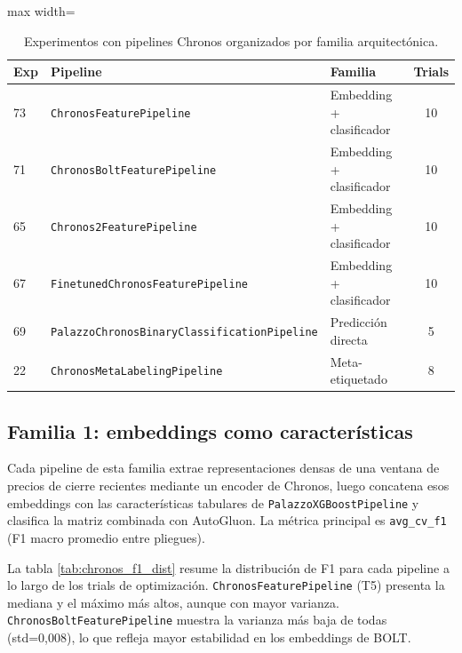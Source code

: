 \begin{table}[H]
    \centering
    \caption[Experimentos Chronos]{Experimentos con pipelines Chronos organizados por familia arquitectónica.}
    \small
    \begin{adjustbox}{max width=\textwidth}
    \begin{tabular}{l l l c}
        \toprule
        \textbf{Exp} & \textbf{Pipeline} & \textbf{Familia} & \textbf{Trials} \\
        \midrule
        73 & \texttt{ChronosFeaturePipeline}             & Embedding + clasificador & 10 \\
        71 & \texttt{ChronosBoltFeaturePipeline}         & Embedding + clasificador & 10 \\
        65 & \texttt{Chronos2FeaturePipeline}            & Embedding + clasificador & 10 \\
        67 & \texttt{FinetunedChronosFeaturePipeline}    & Embedding + clasificador & 10 \\
        69 & \texttt{PalazzoChronosBinaryClassificationPipeline} & Predicción directa & 5 \\
        22 & \texttt{ChronosMetaLabelingPipeline}        & Meta-etiquetado          & 8  \\
        \bottomrule
    \end{tabular}
    \end{adjustbox}
    \label{tab:chronos_experiments}
\end{table}

\subsection{Familia 1: embeddings como características}

Cada pipeline de esta familia extrae representaciones densas de una ventana de precios de cierre recientes mediante un encoder de Chronos, luego concatena esos embeddings con las características tabulares de \texttt{PalazzoXGBoostPipeline} y clasifica la matriz combinada con AutoGluon. La métrica principal es \texttt{avg\_cv\_f1} (F1 macro promedio entre pliegues).

La tabla \ref{tab:chronos_f1_dist} resume la distribución de F1 para cada pipeline a lo largo de los trials de optimización. \texttt{ChronosFeaturePipeline} (T5) presenta la mediana y el máximo más altos, aunque con mayor varianza. \texttt{ChronosBoltFeaturePipeline} muestra la varianza más baja de todas (std=0,008), lo que refleja mayor estabilidad en los embeddings de BOLT.

